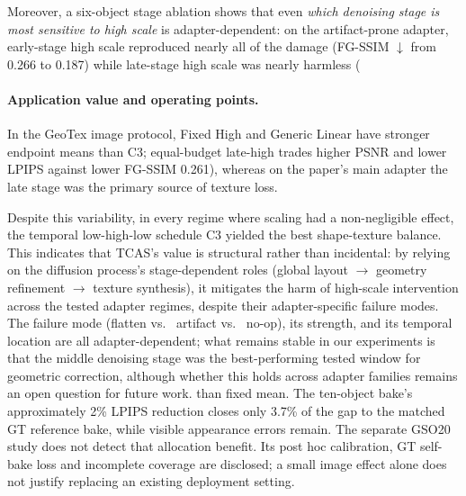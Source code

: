 \documentclass[times,twocolumn,final]{elsarticle}
\providecommand{\DIFadd}[1]{{\protect\color{blue} \sf #1}} %
\providecommand{\DIFdel}[1]{{\protect\color{red} \scriptsize #1}} %
\providecommand{\DIFaddbegin}{} %
\providecommand{\DIFaddend}{} %
\providecommand{\DIFdelbegin}{} %
\providecommand{\DIFdelend}{} %
\begin{document}
\DIFdelbegin \DIFdel{Moreover, a six-object stage ablation shows that even \emph{which denoising stage is most sensitive to high scale} is adapter-dependent: on the artifact-prone adapter, early-stage high scale reproduced nearly all of the damage (FG-SSIM $\downarrow$ from 0.266 to 0.187) while late-stage high scale was nearly harmless (}\DIFdelend \DIFaddbegin \paragraph{Application value and operating points.}
\DIFadd{In the GeoTex image protocol, Fixed High and Generic Linear have stronger endpoint means than C3; equal-budget late-high trades higher PSNR and lower LPIPS against lower }\DIFaddend FG-SSIM \DIFdelbegin \DIFdel{0.261), whereas on the paper's main adapter the late stage was the primary source of texture loss.
}%

\DIFdel{Despite this variability, in every regime where scaling had a non-negligible effect, the temporal low-high-low schedule C3 yielded the best shape-texture balance. This indicates that TCAS's value is structural rather than incidental: by relying on the diffusion process's stage-dependent roles (global layout $\to$ geometry refinement $\to$ texture synthesis), it mitigates the harm of high-scale intervention across the tested adapter regimes, despite their adapter-specific failure modes. The failure mode (flatten vs. \ artifact vs. \ no-op), its strength, and its temporal location are all adapter-dependent; what remains stable in our experiments is that the middle denoising stage was the best-performing tested window for geometric correction, although whether this holds across adapter families remains an open question for future work.
}\DIFdelend \DIFaddbegin \DIFadd{than fixed mean. The ten-object bake's approximately 2\% LPIPS reduction closes only 3.7\% of the gap to the matched GT reference bake, while visible appearance errors remain. The separate GSO20 study does not detect that allocation benefit. Its post hoc calibration, GT self-bake loss and incomplete coverage are disclosed; a small image effect alone does not justify replacing an existing deployment setting.
}\DIFaddend 
\end{document}
